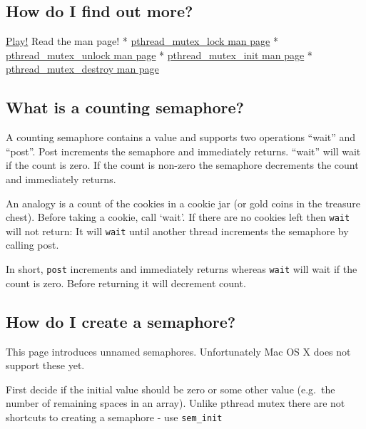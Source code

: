 \subsection{How do I find out more?}\label{how-do-i-find-out-more}

\href{http://cs-education.github.io/sys}{Play!} Read the man page! *
\href{http://linux.die.net/man/3/pthread_mutex_lock}{pthread\_mutex\_lock
man page} *
\href{http://linux.die.net/man/3/pthread_mutex_unlock}{pthread\_mutex\_unlock
man page} *
\href{http://linux.die.net/man/3/pthread_mutex_init}{pthread\_mutex\_init
man page} *
\href{http://linux.die.net/man/3/pthread_mutex_destroy}{pthread\_mutex\_destroy
man page}

\subsection{What is a counting
semaphore?}\label{what-is-a-counting-semaphore}

A counting semaphore contains a value and supports two operations
``wait'' and ``post''. Post increments the semaphore and immediately
returns. ``wait'' will wait if the count is zero. If the count is
non-zero the semaphore decrements the count and immediately returns.

An analogy is a count of the cookies in a cookie jar (or gold coins in
the treasure chest). Before taking a cookie, call `wait'. If there are
no cookies left then \texttt{wait} will not return: It will
\texttt{wait} until another thread increments the semaphore by calling
post.

In short, \texttt{post} increments and immediately returns whereas
\texttt{wait} will wait if the count is zero. Before returning it will
decrement count.

\subsection{How do I create a
semaphore?}\label{how-do-i-create-a-semaphore}

This page introduces unnamed semaphores. Unfortunately Mac OS X does not
support these yet.

First decide if the initial value should be zero or some other value
(e.g.~the number of remaining spaces in an array). Unlike pthread mutex
there are not shortcuts to creating a semaphore - use \texttt{sem\_init}

\begin{Shaded}
\begin{Highlighting}[]

 
  \NormalTok{, }\NormalTok{); }
\NormalTok{\}}
\end{Highlighting}
\end{Shaded}

